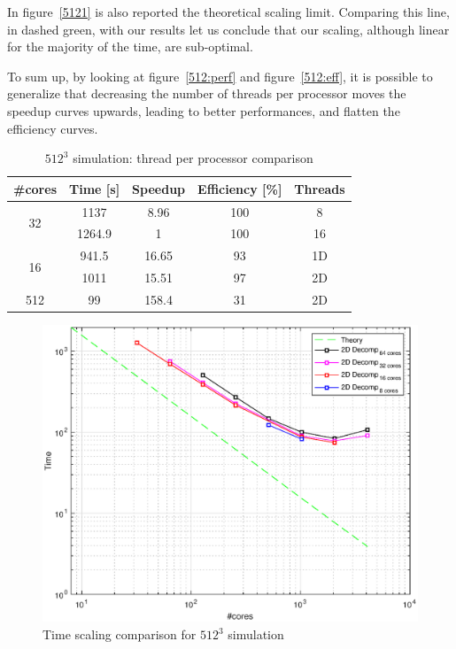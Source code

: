 In figure~\ref{5121} is also reported the theoretical scaling limit. Comparing this line, in dashed green, with our results let us conclude that our scaling, although linear for the majority of the time, are sub-optimal. 
\par
To sum up, by looking at figure~\ref{512:perf} and figure~\ref{512:eff}, it is possible to generalize that decreasing the number of threads per processor moves the speedup curves upwards, leading to better performances, and flatten the efficiency curves.


\begin{table}[h]
\caption{$512^{3}$ simulation: thread per processor comparison}
\begin{center}
\begin{tabular}{c c c c c}
\toprule
\textbf{\#cores} & \textbf{Time [s]} & \textbf{Speedup} & \textbf{Efficiency [\%]} & \textbf{Threads}\\
\midrule
\multirow{2}{*}{32} & 1137 & 8.96 & 100 &8\\
& 1264.9 & 1 & 100 & 16\\
\hline
\multirow{2}{*}{16} & 941.5 & 16.65 & 93 & 1D\\
& 1011 & 15.51 & 97 & 2D\\
\hline
512 & 99 & 158.4 & 31 & 2D\\
\bottomrule
\end{tabular}
\end{center}
\label{512data:multi}
\end{table}




\begin{figure}
\begin{center}
\includegraphics[scale=0.6]{grafici/5124}
\caption{Time scaling comparison for $512^3$ simulation}
\label{512:times}
\end{center}
\end{figure}


